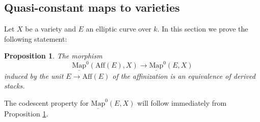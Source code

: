 \documentclass[11pt,letterpaper]{amsart}
\newtheorem{proposition}[dummy]{Proposition}
\newcommand{\Mapo}[2]{\underline{\mathrm{Map}}^{0}\left (#1,#2\right )}
\newcommand{\Spec}{\mathrm{S}\mathrm{pec}\,}
\begin{document}
\subsection{Quasi-constant maps to varieties}
\label{subsection:codescentnoaction}
Let $X$ be a variety and $E$ an elliptic curve over $k$. 
In this section we prove the following statement:
\begin{proposition}
\label{affinization}
The morphism 
$$
\Mapo{\mathrm{Aff}(E)}{X} \to \Mapo{E}{X}
$$
induced by the unit $E \to \mathrm{Aff}(E)$ of the affinization is an equivalence of derived stacks.
\end{proposition}
The codescent property for $\Mapo{E}{X}$ will follow immediately from Proposition \ref{affinization}. 
\end{document}
